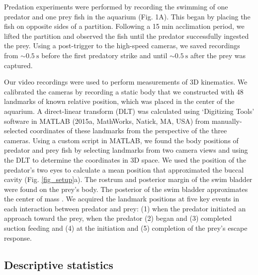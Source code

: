 \documentclass[]{rsos}%
\begin{document}
Predation experiments were performed by recording the swimming of one predator and one prey fish in the aquarium (Fig. 1A). 
This began by placing the fish on opposite sides of a partition.
Following a 15 min acclimation period, we lifted the partition and observed the fish until the predator successfully ingested the prey.
Using a post-trigger to the high-speed cameras, we saved recordings from $\sim \SI{0.5}{\s}$ before the first predatory strike and until $\sim \SI{0.5}{\s}$  after the prey was captured.

Our video recordings were used to perform measurements of 3D kinematics. 
We calibrated the cameras by recording a static body that we constructed with 48 landmarks of known relative position, which was placed in the center of the aquarium.
A direct-linear transform (DLT) was calculated using `Digitizing Tools' software in MATLAB (2015a, MathWorks, Natick, MA, USA) \cite{Hedrick:2008wz} from manually-selected coordinates of these landmarks from the perspective of the three cameras.
Using a custom script in MATLAB, we found the body positions of predator and prey fish by selecting landmarks from two camera views and using the DLT to determine the coordinates in 3D space.
We used the position of the predator's two eyes to calculate a mean position that approximated the buccal cavity (Fig. \ref{fig_setup}a).
The rostrum and posterior margin of the swim bladder were found on the prey's body. 
The posterior of the swim bladder approximates the center of mass \cite{Stewart:2010ig}.
We acquired the landmark positions at five key events in each interaction between predator and prey: (1) when the predator initiated an approach toward the prey, when the predator (2) began and (3) completed suction feeding and (4) at the initiation and (5) completion of the prey's escape response.


\subsection{Descriptive statistics}
\end{document}
